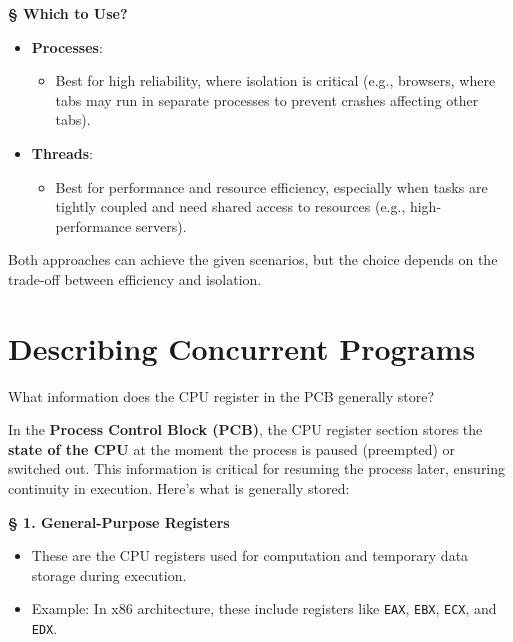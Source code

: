 \documentclass[a4paper]{book}
\newcommand{\sfbf}[1]{{\normalsize\textsf{\textbf{§ #1}}}}
\begin{document}
\hrulefill

\sfbf{Which to Use?}

\begin{itemize}
\item 
\textbf{Processes}:
\begin{itemize}
\item 
Best for high reliability, where isolation is critical (e.g., browsers, where tabs may run in separate processes to prevent crashes affecting other tabs).

\end{itemize}

\item 
\textbf{Threads}:
\begin{itemize}
\item 
Best for performance and resource efficiency, especially when tasks are tightly coupled and need shared access to resources (e.g., high-performance servers).

\end{itemize}

\end{itemize}

Both approaches can achieve the given scenarios, but the choice depends on the trade-off between efficiency and isolation.

\section{Describing Concurrent Programs}

\begin{greenbox}
What information does the CPU register in the PCB generally store?
\end{greenbox}

In the \textbf{Process Control Block (PCB)}, the CPU register section stores the \textbf{state of the CPU} at the moment the process is paused (preempted) or switched out. This information is critical for resuming the process later, ensuring continuity in execution. Here's what is generally stored:

\sfbf{1. General-Purpose Registers}

\begin{itemize}
\item 
These are the CPU registers used for computation and temporary data storage during execution.

\item 
Example: In x86 architecture, these include registers like \verb|EAX|, \verb|EBX|, \verb|ECX|, and \verb|EDX|.

\end{itemize}
\end{document}
